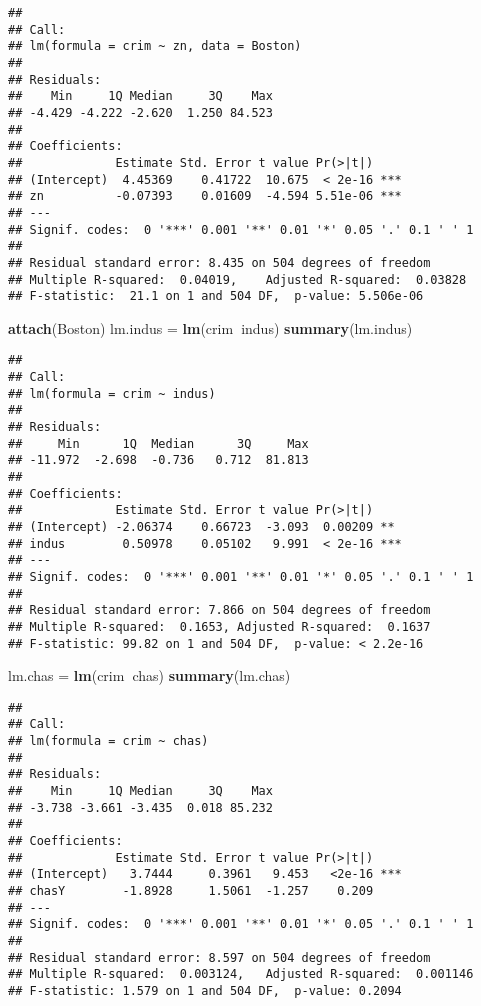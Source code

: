 \documentclass[]{article}
\newenvironment{Shaded}{\begin{snugshade}}{\end{snugshade}}
\newcommand{\KeywordTok}[1]{\textcolor[rgb]{0.13,0.29,0.53}{\textbf{#1}}}
\newcommand{\NormalTok}[1]{#1}
\newcommand{\OperatorTok}[1]{\textcolor[rgb]{0.81,0.36,0.00}{\textbf{#1}}}
\newcommand{\StringTok}[1]{\textcolor[rgb]{0.31,0.60,0.02}{#1}}
\begin{document}
\begin{verbatim}
## 
## Call:
## lm(formula = crim ~ zn, data = Boston)
## 
## Residuals:
##    Min     1Q Median     3Q    Max 
## -4.429 -4.222 -2.620  1.250 84.523 
## 
## Coefficients:
##             Estimate Std. Error t value Pr(>|t|)    
## (Intercept)  4.45369    0.41722  10.675  < 2e-16 ***
## zn          -0.07393    0.01609  -4.594 5.51e-06 ***
## ---
## Signif. codes:  0 '***' 0.001 '**' 0.01 '*' 0.05 '.' 0.1 ' ' 1
## 
## Residual standard error: 8.435 on 504 degrees of freedom
## Multiple R-squared:  0.04019,    Adjusted R-squared:  0.03828 
## F-statistic:  21.1 on 1 and 504 DF,  p-value: 5.506e-06
\end{verbatim}

\begin{Shaded}
\begin{Highlighting}[]
\KeywordTok{attach}\NormalTok{(Boston)}
\NormalTok{lm.indus =}\StringTok{ }\KeywordTok{lm}\NormalTok{(crim}\OperatorTok{~}\NormalTok{indus)}
\KeywordTok{summary}\NormalTok{(lm.indus)}
\end{Highlighting}
\end{Shaded}

\begin{verbatim}
## 
## Call:
## lm(formula = crim ~ indus)
## 
## Residuals:
##     Min      1Q  Median      3Q     Max 
## -11.972  -2.698  -0.736   0.712  81.813 
## 
## Coefficients:
##             Estimate Std. Error t value Pr(>|t|)    
## (Intercept) -2.06374    0.66723  -3.093  0.00209 ** 
## indus        0.50978    0.05102   9.991  < 2e-16 ***
## ---
## Signif. codes:  0 '***' 0.001 '**' 0.01 '*' 0.05 '.' 0.1 ' ' 1
## 
## Residual standard error: 7.866 on 504 degrees of freedom
## Multiple R-squared:  0.1653, Adjusted R-squared:  0.1637 
## F-statistic: 99.82 on 1 and 504 DF,  p-value: < 2.2e-16
\end{verbatim}

\begin{Shaded}
\begin{Highlighting}[]
\NormalTok{lm.chas =}\StringTok{ }\KeywordTok{lm}\NormalTok{(crim}\OperatorTok{~}\NormalTok{chas) }
\KeywordTok{summary}\NormalTok{(lm.chas)}
\end{Highlighting}
\end{Shaded}

\begin{verbatim}
## 
## Call:
## lm(formula = crim ~ chas)
## 
## Residuals:
##    Min     1Q Median     3Q    Max 
## -3.738 -3.661 -3.435  0.018 85.232 
## 
## Coefficients:
##             Estimate Std. Error t value Pr(>|t|)    
## (Intercept)   3.7444     0.3961   9.453   <2e-16 ***
## chasY        -1.8928     1.5061  -1.257    0.209    
## ---
## Signif. codes:  0 '***' 0.001 '**' 0.01 '*' 0.05 '.' 0.1 ' ' 1
## 
## Residual standard error: 8.597 on 504 degrees of freedom
## Multiple R-squared:  0.003124,   Adjusted R-squared:  0.001146 
## F-statistic: 1.579 on 1 and 504 DF,  p-value: 0.2094
\end{verbatim}
\end{document}
